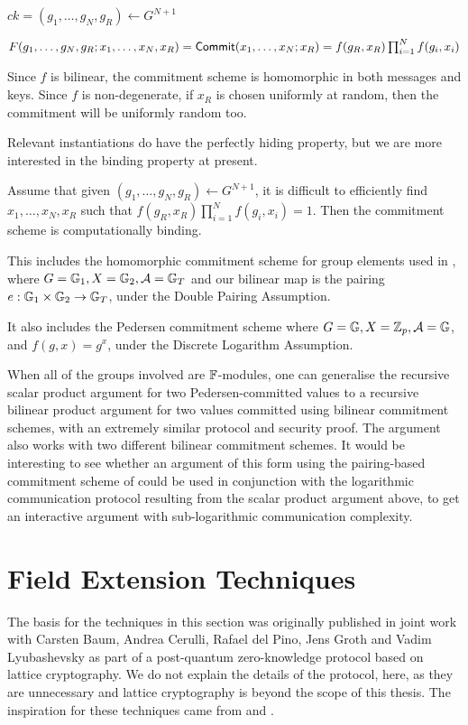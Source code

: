 {$ck = (g_1,\ldots,g_N,g_R) \gets G^{N+1}$

$F(g_1,\ldots,g_N,g_R;x_1,\ldots,x_N,x_R) = \mathsf{Commit}  (x_1,\ldots,x_N;x_R) = f(g_R,x_R) \prod_{i=1}^N f(g_i,x_i)$

Since $f$ is bilinear, the commitment scheme is homomorphic in both messages and keys. Since $f$ is non-degenerate, if $x_R$ is chosen uniformly at random, then the commitment will be uniformly random too.

Relevant instantiations do have the perfectly hiding property, but we are more interested in the binding property at present.

\begin{lemma} 
Assume that given $(g_1,\ldots,g_N,g_R) \gets G^{N+1}$, it is difficult to efficiently find $x_1,\ldots,x_N,x_R$ such that $f(g_R,x_R) \prod_{i=1}^N f(g_i,x_i) = 1$. Then the commitment scheme is computationally binding.
\end{lemma}

This includes the homomorphic commitment scheme for group elements used in \cite{Groth11}, where $G = \mathbb{G}_1, X = \mathbb{G}_2, \mathcal{A} = \mathbb{G}_T$ and our bilinear map is the pairing $e : \mathbb{G}_1 \times \mathbb{G}_2 \to \mathbb{G}_T$, under the Double Pairing Assumption.

It also includes the Pedersen commitment scheme where $G = \mathbb{G}, X = \mathbb{Z}_p, \mathcal{A} = \mathbb{G}$, and $f(g,x) = g^x$, under the Discrete Logarithm Assumption.

When all of the groups involved are $\mathbb{F}$-modules, one can generalise the recursive scalar product argument for two Pedersen-committed values to a recursive bilinear product argument for two values committed using bilinear commitment schemes, with an extremely similar protocol and security proof. The argument also works with two different bilinear commitment schemes. It would be interesting to see whether an argument of this form using the pairing-based commitment scheme of \cite{Groth11} could be used in conjunction with the logarithmic communication protocol resulting from the scalar product argument above, to get an interactive argument with sub-logarithmic communication complexity.

\section{Field Extension Techniques}\label{sec:fieldext}

The basis for the techniques in this section was originally published in joint work \cite{BootleCCGP16} with Carsten Baum, Andrea Cerulli, Rafael del Pino, Jens Groth and Vadim Lyubashevsky as part of a post-quantum zero-knowledge protocol based on lattice cryptography. We do not explain the details of the protocol, here, as they are unnecessary and lattice cryptography is beyond the scope of this thesis. The inspiration for these techniques came from \cite{CramerDK14} and \cite{CramerDP12}.

}
